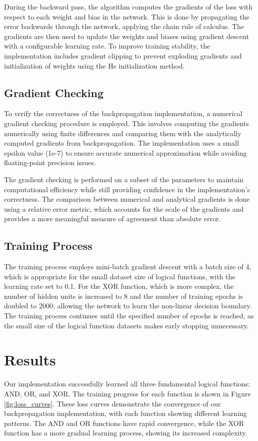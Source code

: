 \documentclass[11pt,a4paper]{article}
\begin{document}
During the backward pass, the algorithm computes the gradients of the loss with respect to each weight and bias in the network. This is done by propagating the error backwards through the network, applying the chain rule of calculus. The gradients are then used to update the weights and biases using gradient descent with a configurable learning rate. To improve training stability, the implementation includes gradient clipping to prevent exploding gradients and initialization of weights using the He initialization method.

\subsection{Gradient Checking}
To verify the correctness of the backpropagation implementation, a numerical gradient checking procedure is employed. This involves computing the gradients numerically using finite differences and comparing them with the analytically computed gradients from backpropagation. The implementation uses a small epsilon value (1e-7) to ensure accurate numerical approximation while avoiding floating-point precision issues.

The gradient checking is performed on a subset of the parameters to maintain computational efficiency while still providing confidence in the implementation's correctness. The comparison between numerical and analytical gradients is done using a relative error metric, which accounts for the scale of the gradients and provides a more meaningful measure of agreement than absolute error.

\subsection{Training Process}
The training process employs mini-batch gradient descent with a batch size of 4, which is appropriate for the small dataset size of logical functions, with the learning rate set to 0.1. For the XOR function, which is more complex, the number of hidden units is increased to 8 and the number of training epochs is doubled to 2000, allowing the network to learn the non-linear decision boundary. The training process continues until the specified number of epochs is reached, as the small size of the logical function datasets makes early stopping unnecessary.

\section{Results}
\label{sec:results}
Our implementation successfully learned all three fundamental logical functions: AND, OR, and XOR. The training progress for each function is shown in Figure \ref{fig:loss_curves}. These loss curves demonstrate the convergence of our backpropagation implementation, with each function showing different learning patterns. The AND and OR functions have rapid convergence, while the XOR function has a more gradual learning process, showing its increased complexity.
\end{document}
